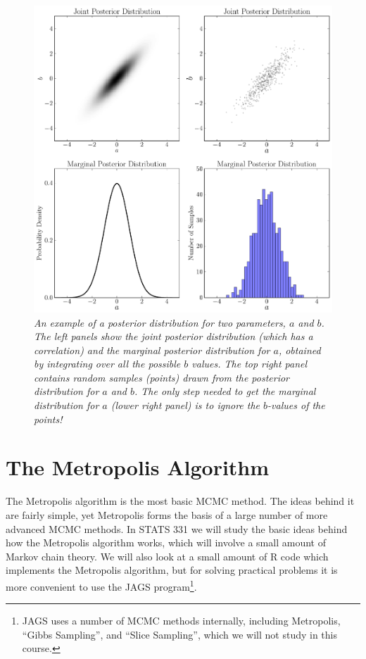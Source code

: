 \begin{figure}[ht!]
\begin{center}
\includegraphics[scale=0.5]{Figures/marginalisation.pdf}
\caption{\it An example of a posterior distribution for two parameters, $a$ and
$b$. The left panels show the joint posterior distribution (which has a
correlation) and the marginal posterior distribution for $a$, obtained by
integrating over all the possible $b$ values. The top right panel contains
random samples
(points) drawn from the posterior distribution for $a$ and $b$.
The only step needed to get the
marginal distribution for $a$ (lower right panel) is to ignore the $b$-values of
the points!
\label{fig:marginalisation}}
\end{center}
\end{figure}


\section{The Metropolis Algorithm}
The Metropolis algorithm is the most basic MCMC method.
The ideas behind it are fairly simple, yet Metropolis forms the basis of a large
number of more advanced MCMC methods. In STATS 331 we will study the basic ideas
behind how the Metropolis algorithm works, which will involve a small amount
of Markov chain theory. We will also look at a small amount of R code
which implements the Metropolis algorithm, but for solving practical problems
it is more convenient to use the JAGS program\footnote{JAGS uses a number
of MCMC methods internally, including Metropolis, ``Gibbs Sampling'', and
``Slice Sampling'', which we will not study in this course.}.

